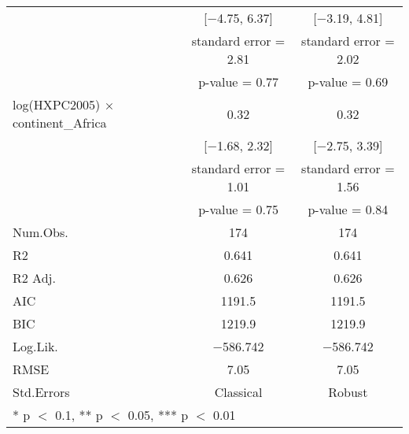 \documentclass[
]{article}
\begin{document}
\begin{table}
\begin{tabular}[t]{lcc}
 & {}[\num{-4.75}, \num{6.37}] & {}[\num{-3.19}, \num{4.81}]\\
 & standard error = \num{2.81} & standard error = \num{2.02}\\
 & p-value = \num{0.77} & p-value = \num{0.69}\\
log(HXPC2005) × continent\_Africa & \num{0.32} & \num{0.32}\\
 & {}[\num{-1.68}, \num{2.32}] & {}[\num{-2.75}, \num{3.39}]\\
 & standard error = \num{1.01} & standard error = \num{1.56}\\
 & p-value = \num{0.75} & p-value = \num{0.84}\\
\midrule
Num.Obs. & \num{174} & \num{174}\\
R2 & \num{0.641} & \num{0.641}\\
R2 Adj. & \num{0.626} & \num{0.626}\\
AIC & \num{1191.5} & \num{1191.5}\\
BIC & \num{1219.9} & \num{1219.9}\\
Log.Lik. & \num{-586.742} & \num{-586.742}\\
RMSE & \num{7.05} & \num{7.05}\\
Std.Errors & Classical & Robust\\
\bottomrule
\multicolumn{3}{l}{\rule{0pt}{1em}* p $<$ 0.1, ** p $<$ 0.05, *** p $<$ 0.01}\\
\end{tabular}
\end{table}
\end{document}
